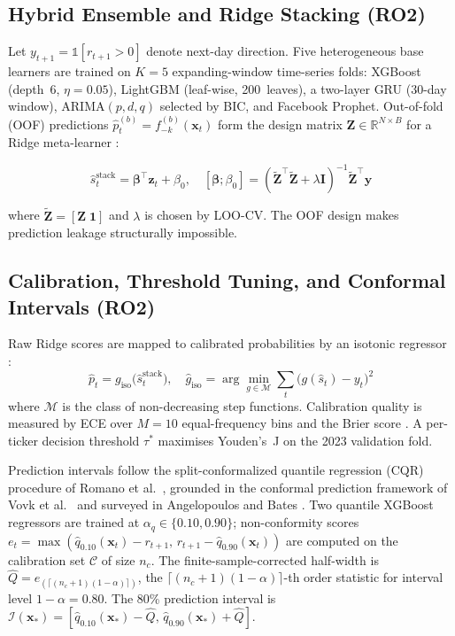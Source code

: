 \documentclass[12pt,a4paper]{article}
\begin{document}
\subsection{Hybrid Ensemble and Ridge Stacking (RO2)}

Let $y_{t+1}=\mathbb{1}[r_{t+1}>0]$ denote next-day direction. Five heterogeneous
base learners are trained on $K=5$ expanding-window time-series folds:
XGBoost \cite{r13} (depth~6, $\eta=0.05$), LightGBM \cite{r14} (leaf-wise,
200~leaves), a two-layer GRU \cite{r15} (30-day window), ARIMA$(p,d,q)$ selected
by BIC, and Facebook Prophet. Out-of-fold (OOF) predictions
$\hat{p}_t^{(b)}=f_{-k}^{(b)}(\mathbf{x}_t)$ form the design matrix
$\mathbf{Z}\!\in\!\mathbb{R}^{N\times B}$ for a Ridge meta-learner \cite{r16}:

\begin{equation}
\hat{s}_t^{\mathrm{stack}}=\boldsymbol{\beta}^{\!\top}\mathbf{z}_t+\beta_0,\quad
[\boldsymbol{\beta};\beta_0]=(\tilde{\mathbf{Z}}^{\!\top}\tilde{\mathbf{Z}}+\lambda\mathbf{I})^{-1}\tilde{\mathbf{Z}}^{\!\top}\mathbf{y}
\label{eq:stack}
\end{equation}

\noindent where $\tilde{\mathbf{Z}}=[\mathbf{Z}\;\mathbf{1}]$ and $\lambda$ is
chosen by LOO-CV. The OOF design makes prediction leakage structurally impossible.

\subsection{Calibration, Threshold Tuning, and Conformal Intervals (RO2)}

Raw Ridge scores are mapped to calibrated probabilities by an isotonic
regressor \cite{r17}:
\begin{equation}
\hat{p}_t=g_{\mathrm{iso}}\!\bigl(\hat{s}_t^{\mathrm{stack}}\bigr),\quad
\hat{g}_{\mathrm{iso}}=\arg\min_{g\in\mathcal{M}}\sum_t\!\bigl(g(\hat{s}_t)-y_t\bigr)^2
\label{eq:isotonic}
\end{equation}
where $\mathcal{M}$ is the class of non-decreasing step functions.
Calibration quality is measured by ECE over $M=10$ equal-frequency bins and the
Brier score \cite{r34}. A per-ticker decision threshold $\tau^*$ maximises
Youden's~J on the 2023 validation fold.

Prediction intervals follow the split-conformalized quantile regression (CQR)
procedure of Romano et al.\ \cite{r26}, grounded in the conformal prediction
framework of Vovk et al.\ \cite{r18} and surveyed in Angelopoulos and Bates \cite{r33}. Two quantile XGBoost regressors are
trained at $\alpha_q\!\in\!\{0.10,0.90\}$; non-conformity scores
$e_t=\max(\hat{q}_{0.10}(\mathbf{x}_t)-r_{t+1},\,r_{t+1}-\hat{q}_{0.90}(\mathbf{x}_t))$
are computed on the calibration set $\mathcal{C}$ of size $n_c$. The
finite-sample-corrected half-width is
$\hat{Q}=e_{(\lceil(n_c+1)(1-\alpha)\rceil)}$, the
$\lceil(n_c+1)(1-\alpha)\rceil$-th order statistic for interval
level $1-\alpha=0.80$. The 80\% prediction interval is
$\mathcal{I}(\mathbf{x}_*)=[\hat{q}_{0.10}(\mathbf{x}_*)-\hat{Q},\,\hat{q}_{0.90}(\mathbf{x}_*)+\hat{Q}]$.
\end{document}
